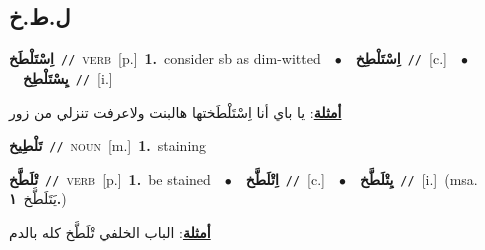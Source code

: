 \documentclass[10pt,a4paper,twoside]{article} %
\begin{document}
\begin{multicols}{2}
\vspace{-3mm}
\subsection*{\color{blue}\foreignlanguage{arabic}{ل.ط.خ}\color{blue}{}} 

{\setlength\topsep{0pt}\textbf{\foreignlanguage{arabic}{اِسْتَلْطَخ}}\ {\color{gray}\texttt{//}\color{black}}\ \textsc{verb}\ [p.]\ \textbf{1.}~consider sb as dim-witted\ \ $\bullet$\ \ \setlength\topsep{0pt}\textbf{\foreignlanguage{arabic}{اِسْتَلْطِخ}}\ {\color{gray}\texttt{//}\color{black}}\ [c.]\ \ $\bullet$\ \ \setlength\topsep{0pt}\textbf{\foreignlanguage{arabic}{يِسْتَلْطِخ}}\ {\color{gray}\texttt{//}\color{black}}\ [i.]\  \begin{flushright}\color{gray}\foreignlanguage{arabic}{\textbf{\underline{\foreignlanguage{arabic}{أمثلة}}}: يا باي أنا اِسْتَلْطَختها هالبنت ولاعرفت تنزلي من زور}\end{flushright}\color{black}} \vspace{2mm}

{\setlength\topsep{0pt}\textbf{\foreignlanguage{arabic}{تَلْطِيخ}}\ {\color{gray}\texttt{//}\color{black}}\ \textsc{noun}\ [m.]\ \textbf{1.}~staining\ } \vspace{2mm}

{\setlength\topsep{0pt}\textbf{\foreignlanguage{arabic}{تْلَطَّخ}}\ {\color{gray}\texttt{//}\color{black}}\ \textsc{verb}\ [p.]\ \textbf{1.}~be stained\ \ $\bullet$\ \ \setlength\topsep{0pt}\textbf{\foreignlanguage{arabic}{اِتْلَطَّخ}}\ {\color{gray}\texttt{//}\color{black}}\ [c.]\ \ $\bullet$\ \ \setlength\topsep{0pt}\textbf{\foreignlanguage{arabic}{يِتْلَطَّخ}}\ {\color{gray}\texttt{//}\color{black}}\ [i.]\ \color{gray}(msa. \foreignlanguage{arabic}{يَتَلَطَّخ}~\foreignlanguage{arabic}{\textbf{١.}})\color{black}\  \begin{flushright}\color{gray}\foreignlanguage{arabic}{\textbf{\underline{\foreignlanguage{arabic}{أمثلة}}}: الباب الخلفي تْلَطَّخ كله بالدم}\end{flushright}\color{black}} \vspace{2mm}


\end{multicols}
\end{document}
